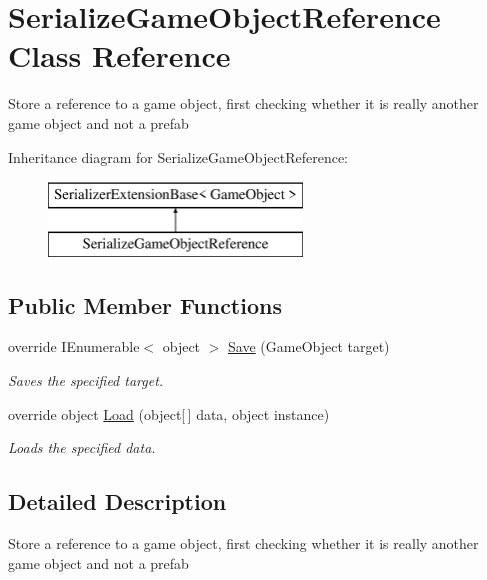 \hypertarget{class_serialize_game_object_reference}{}\section{Serialize\+Game\+Object\+Reference Class Reference}
\label{class_serialize_game_object_reference}


Store a reference to a game object, first checking whether it is really another game object and not a prefab  


Inheritance diagram for Serialize\+Game\+Object\+Reference\+:\begin{figure}[H]
\begin{center}
\leavevmode
\includegraphics[height=2.000000cm]{class_serialize_game_object_reference}
\end{center}
\end{figure}
\subsection*{Public Member Functions}
\begin{DoxyCompactItemize}
\item 
override I\+Enumerable$<$ object $>$ \hyperlink{class_serialize_game_object_reference_a787a0671d47d542cd3df6f40c486d321}{Save} (Game\+Object target)
\begin{DoxyCompactList}\small\item\em Saves the specified target. \end{DoxyCompactList}\item 
override object \hyperlink{class_serialize_game_object_reference_a10255a41c68c84a3cc2495fb58fbc235}{Load} (object\mbox{[}$\,$\mbox{]} data, object instance)
\begin{DoxyCompactList}\small\item\em Loads the specified data. \end{DoxyCompactList}\end{DoxyCompactItemize}


\subsection{Detailed Description}
Store a reference to a game object, first checking whether it is really another game object and not a prefab 



